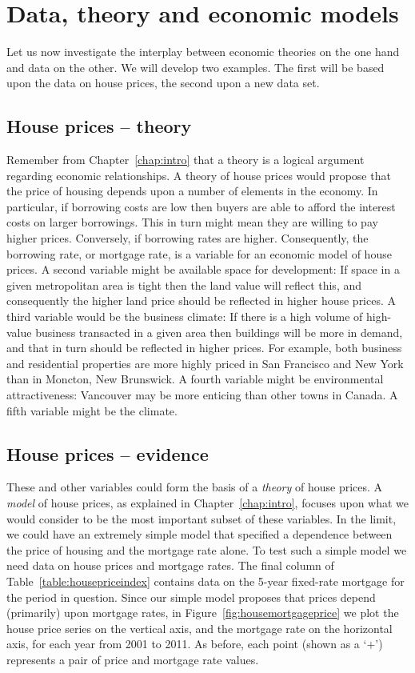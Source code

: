 \section{Data, theory and economic models}\label{sec:ch2sec2}

Let us now investigate the interplay between economic theories on the one
hand and data on the other. We will develop two examples. The first will be
based upon the data on house prices, the second upon a new data set.

\subsection*{House prices -- theory}

Remember from Chapter~\ref{chap:intro} that a theory is a logical argument regarding economic
relationships. A theory of house prices would propose that the price of
housing depends upon a number of elements in the economy. In particular, if
borrowing costs are low then buyers are able to afford the interest costs on
larger borrowings. This in turn might mean they are willing to pay higher
prices. Conversely, if borrowing rates are higher. Consequently, the
borrowing rate, or mortgage rate, is a variable for an economic model of
house prices. A second variable might be available space for development: If
space in a given metropolitan area is tight then the land value will reflect
this, and consequently the higher land price should be reflected in higher
house prices. A third variable would be the business climate: If there is a
high volume of high-value business transacted in a given area then buildings
will be more in demand, and that in turn should be reflected in higher
prices. For example, both business and residential properties are more
highly priced in San Francisco and New York than in Moncton, New Brunswick. A
fourth variable might be environmental attractiveness: Vancouver may be more
enticing than other towns in Canada. A fifth variable might be
the climate.

\newhtmlpage

\subsection*{House prices -- evidence}

These and other variables could form the basis of a \textit{theory} of house
prices. A \textit{model} of house prices, as explained in Chapter~\ref{chap:intro}, focuses upon
what we would consider to be the most important subset of these variables.
In the limit, we could have an extremely simple model that specified a
dependence between the price of housing and the mortgage rate alone. To test
such a simple model we need data on house prices and mortgage rates. The
final column of Table~\ref{table:housepriceindex} contains data on the 5-year fixed-rate mortgage
for the period in question. Since our simple model proposes that prices
depend (primarily) upon mortgage rates, in Figure~\ref{fig:housemortgageprice} we plot the 
house price series on the vertical axis, and the mortgage rate on the
horizontal axis, for each year from 2001 to 2011. As before, each point (shown as a `$+$')
represents a pair of price and mortgage rate values.

